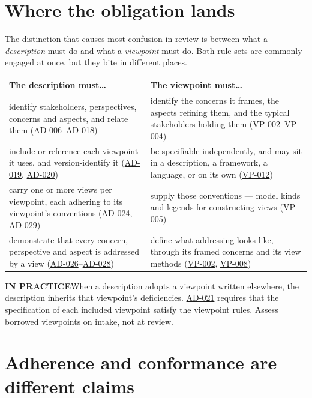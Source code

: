\documentclass[11pt,a4paper]{report}
\newcommand{\calloutlead}[2]{{\sffamily\bfseries\footnotesize\color{#1}#2\quad}}
\newcommand{\tip}[1]{\begin{tipbox}\calloutlead{teal}{IN PRACTICE}#1\end{tipbox}}
\newcommand{\rref}[1]{\hyperref[rule:#1]{\textsf{\small #1}}}
\begin{document}
\section{Where the obligation lands}

The distinction that causes most confusion in review is between what a
\emph{description} must do and what a \emph{viewpoint} must do. Both rule sets
are commonly engaged at once, but they bite in different places.

\begin{center}
\small
\begin{tabular}{@{}L{68mm} L{68mm}@{}}
\toprule
\textbf{The description must\ldots} & \textbf{The viewpoint must\ldots} \\
\midrule
identify stakeholders, perspectives, concerns and aspects, and relate them
  (\rref{AD-006}--\rref{AD-018})
  & identify the concerns it frames, the aspects refining them, and the typical
    stakeholders holding them
    (\rref{VP-002}--\rref{VP-004}) \\
\addlinespace
include or reference each viewpoint it uses, and version-identify it
  (\rref{AD-019}, \rref{AD-020})
  & be specifiable independently, and may sit in a description, a framework, a
    language, or on its own (\rref{VP-012}) \\
\addlinespace
carry one or more views per viewpoint, each adhering to its viewpoint's
  conventions (\rref{AD-024}, \rref{AD-029})
  & supply those conventions --- model kinds and legends for constructing views
    (\rref{VP-005}) \\
\addlinespace
demonstrate that every concern, perspective and aspect is addressed by a view
  (\rref{AD-026}--\rref{AD-028})
  & define what addressing looks like, through its framed concerns and its view
    methods (\rref{VP-002}, \rref{VP-008}) \\
\bottomrule
\end{tabular}
\end{center}

\tip{When a description adopts a viewpoint written elsewhere, the description
inherits that viewpoint's deficiencies. \rref{AD-021} requires
that the specification of each included viewpoint satisfy the viewpoint rules.
Assess borrowed viewpoints on intake, not at review.}

\section{Adherence and conformance are different claims}
\end{document}
